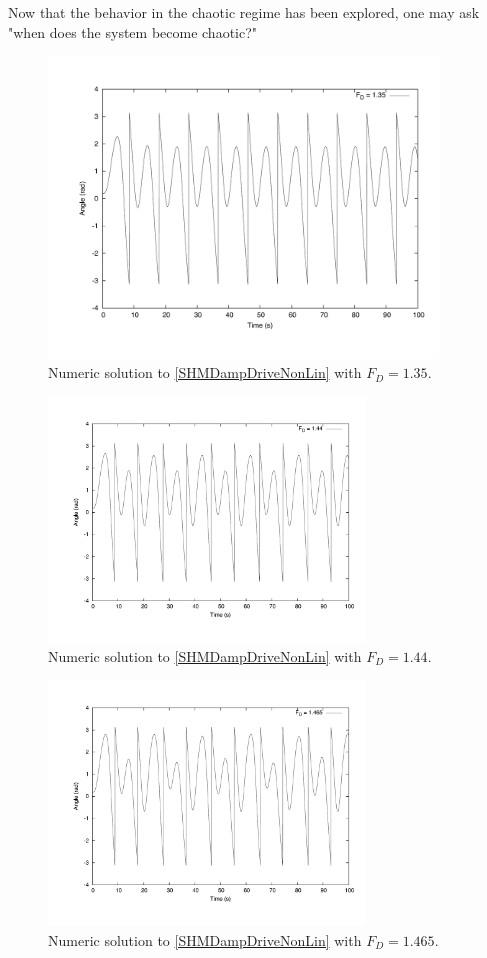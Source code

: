 \documentclass[12pt]{article}
\begin{document}
Now that the behavior in the chaotic regime has been explored, one may ask "when does the system become chaotic?"  
\begin{figure}[!h]
\centering
\includegraphics[width =110 mm, height = 80mm]{Fig_3_10_35.pdf}
\caption{Numeric solution to \eqref{SHMDampDriveNonLin} with $F_D=1.35$.}
\label{fig:3_10_35}
\end{figure}
\begin{figure}[!h]
\centering
\includegraphics[width =110 mm, height = 65mm]{Fig_3_10_44.pdf}
\caption{Numeric solution to \eqref{SHMDampDriveNonLin} with $F_D=1.44$.}
\label{fig:3_10_44}
\end{figure}
\begin{figure}[!h]
\centering
\includegraphics[width =110 mm, height = 65mm]{Fig_3_10_465.pdf}
\caption{Numeric solution to \eqref{SHMDampDriveNonLin} with $F_D=1.465$.}
\label{fig:3_10_465}
\end{figure}
\end{document}

